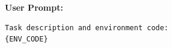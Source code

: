\textbf{User Prompt:}
\begin{lstlisting}[language={}]
Task description and environment code:
{ENV_CODE}
\end{lstlisting}
